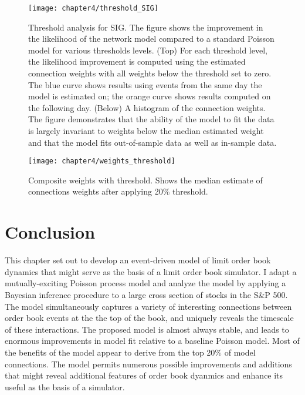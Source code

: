 		\begin{figure}[p]
			\small
			\linespread{1}
			\centering
			\captionsetup{labelsep=colon, font=footnotesize, justification=centerfirst, width=\linewidth}
			\texttt{[image: chapter4/threshold\_SIG]}
			\captionsetup{skip=-20pt, position=below, font=footnotesize, justification=justified, width=\linewidth}
			\caption[Threshold analysis for SIG]{Threshold analysis for SIG. The figure shows the improvement in the likelihood of the network model compared to a standard Poisson model for various thresholds levels. (Top) For each threshold level, the likelihood improvement is computed using the estimated connection weights with all weights below the threshold set to zero. The blue curve shows results using events from the same day the model is estimated on; the orange curve shows results computed on the following day. (Below) A histogram of the connection weights. The figure demonstrates that the ability of the model to fit the data is largely invariant to weights below the median estimated weight and that the model fits out-of-sample data as well as in-sample data.}
			\label{fig:threshold_SIG}
		\end{figure}

		\begin{figure}[p]
			\small
			\linespread{1}
			\centering
			\texttt{[image: chapter4/weights\_threshold]}
			\captionsetup{skip=-20pt, position=below, font=footnotesize, justification=justified, width=\linewidth}
			\caption[Composite weights with threshold]{Composite weights with threshold. Shows the median estimate of connections weights after applying 20\% threshold.}
			\label{fig:weights_threshold}
		\end{figure}


\section{Conclusion}
	This chapter set out to develop an event-driven model of limit order book dynamics that might serve as the basis of a limit order book simulator. I adapt a mutually-exciting Poisson process model and analyze the model by applying a Bayesian inference procedure to a large cross section of stocks in the S\&P 500. The model simultaneously captures a variety of interesting connections between order book events at the the top of the book, and uniquely reveals the timescale of these interactions. The proposed model is almost always stable, and leads to enormous improvements in model fit relative to a baseline Poisson model. Most of the benefits of the model appear to derive from the top 20\% of model connections. The model permits numerous possible improvements and additions that might reveal additional features of order book dyanmics and enhance its useful as the basis of a simulator.
